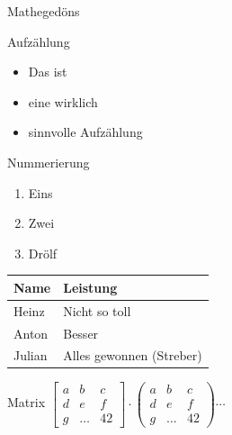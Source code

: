 \documentclass[shortpres]{beamer}
\begin{document}
\begin{frame}{Mathegedöns}
	\begin{multicols}{2}
		
		Aufzählung
		\begin{itemize}
			\item Das ist
			\item eine wirklich
			\item sinnvolle Aufzählung
		\end{itemize}
		
		\vspace{10pt}
		
		Nummerierung
		\begin{enumerate}
			\item Eins
			\item Zwei
			\item Drölf
		\end{enumerate}
		
		\vspace{10pt}
		
		\begin{tabular}{ll}
			Name & Leistung\\
			\hline
			Heinz & Nicht so toll\\
			Anton & Besser\\
			Julian & Alles gewonnen (Streber)
		\end{tabular}
		
	\columnbreak
		
		Matrix \hspace{10pt}
		$
			\begin{bmatrix}
				a & b & c\\
				d & e & f\\
				g & \dots & 42
			\end{bmatrix}
			\cdot
			\begin{pmatrix}
			a & b & c\\
			d & e & f\\
			g & \dots & 42
			\end{pmatrix}
			\cdots
		$
		
	\end{multicols}
	
\end{frame}
\end{document}

